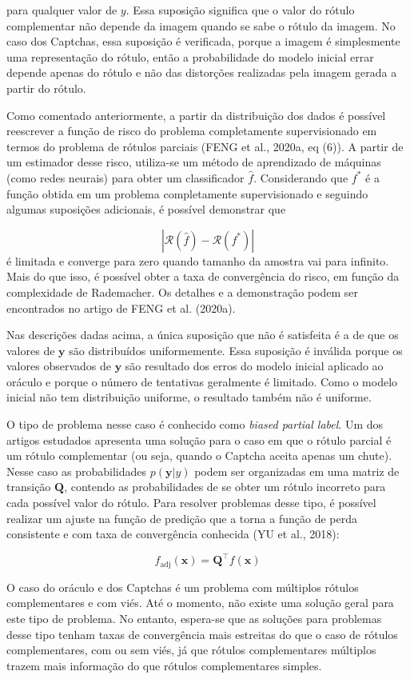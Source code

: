 \documentclass[12pt,twoside,brazilian]{book}
\begin{document}
para qualquer valor de \(y\). Essa suposição significa que o valor do
rótulo complementar não depende da imagem quando se sabe o rótulo da
imagem. No caso dos Captchas, essa suposição é verificada, porque a
imagem é simplesmente uma representação do rótulo, então a probabilidade
do modelo inicial errar depende apenas do rótulo e não das distorções
realizadas pela imagem gerada a partir do rótulo.

Como comentado anteriormente, a partir da distribuição dos dados é
possível reescrever a função de risco do problema completamente
supervisionado em termos do problema de rótulos parciais (FENG et al.,
2020a, eq (6)). A partir de um estimador desse risco, utiliza-se um
método de aprendizado de máquinas (como redes neurais) para obter um
classificador \(\hat f\). Considerando que \(f^*\) é a função obtida em
um problema completamente supervisionado e seguindo algumas suposições
adicionais, é possível demonstrar que

\[
|\mathcal R(\hat f) - \mathcal R(f^*)|
\] é limitada e converge para zero quando tamanho da amostra vai para
infinito. Mais do que isso, é possível obter a taxa de convergência do
risco, em função da complexidade de Rademacher. Os detalhes e a
demonstração podem ser encontrados no artigo de FENG et al. (2020a).

Nas descrições dadas acima, a única suposição que não é satisfeita é a
de que os valores de \(\mathbf y\) são distribuídos uniformemente. Essa
suposição é inválida porque os valores observados de \(\mathbf y\) são
resultado dos erros do modelo inicial aplicado ao oráculo e porque o
número de tentativas geralmente é limitado. Como o modelo inicial não
tem distribuição uniforme, o resultado também não é uniforme.

O tipo de problema nesse caso é conhecido como \emph{biased partial
label}. Um dos artigos estudados apresenta uma solução para o caso em
que o rótulo parcial é um rótulo complementar (ou seja, quando o Captcha
aceita apenas um chute). Nesse caso as probabilidades
\(p(\mathbf y| y)\) podem ser organizadas em uma matriz de transição
\(\mathbf Q\), contendo as probabilidades de se obter um rótulo
incorreto para cada possível valor do rótulo. Para resolver problemas
desse tipo, é possível realizar um ajuste na função de predição que a
torna a função de perda consistente e com taxa de convergência conhecida
(YU et al., 2018):

\[
f_{\text{adj}} (\mathbf x) = \mathbf Q ^{\top}f(\mathbf x)
\]

O caso do oráculo e dos Captchas é um problema com múltiplos rótulos
complementares e com viés. Até o momento, não existe uma solução geral
para este tipo de problema. No entanto, espera-se que as soluções para
problemas desse tipo tenham taxas de convergência mais estreitas do que
o caso de rótulos complementares, com ou sem viés, já que rótulos
complementares múltiplos trazem mais informação do que rótulos
complementares simples.
\end{document}
